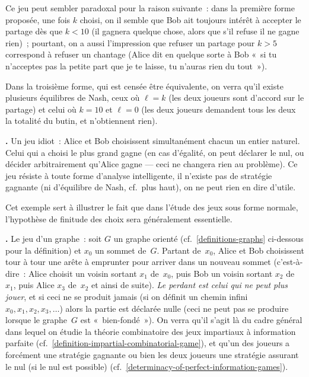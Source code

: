 \documentclass[12pt,a4paper]{article}
\theoremstyle{definition}
\newcommand\thingy{%
\refstepcounter{comcnt}\smallskip\noindent\textbf{\thecomcnt.} }
\begin{document}
Ce jeu peut sembler paradoxal pour la raison suivante : dans la
première forme proposée, une fois $k$ choisi, on il semble que Bob ait
toujours intérêt à accepter le partage dès que $k<10$ (il gagnera
quelque chose, alors que s'il refuse il ne gagne rien) ; pourtant, on
a aussi l'impression que refuser un partage pour $k>5$ correspond à
refuser un chantage (Alice dit en quelque sorte à Bob « si tu
n'acceptes pas la petite part que je te laisse, tu n'auras rien du
tout »).

Dans la troisième forme, qui est censée être équivalente, on verra
qu'il existe plusieurs équilibres de Nash, ceux où $\ell=k$ (les deux
joueurs sont d'accord sur le partage) et celui où $k=10$ et $\ell=0$
(les deux joueurs demandent tous les deux la totalité du butin, et
n'obtiennent rien).

\thingy Un jeu idiot : Alice et Bob choisissent simultanément chacun
un entier naturel.  Celui qui a choisi le plus grand gagne (en cas
d'égalité, on peut déclarer le nul, ou décider arbitrairement qu'Alice
gagne — ceci ne changera rien au problème).  Ce jeu résiste à toute
forme d'analyse intelligente, il n'existe pas de stratégie gagnante
(ni d'équilibre de Nash, cf. plus haut), on ne peut rien en dire
d'utile.

Cet exemple sert à illustrer le fait que dans l'étude des jeux sous
forme normale, l'hypothèse de finitude des choix sera généralement
essentielle.

\thingy\label{introduction-graph-game} Le jeu d'un graphe : soit $G$
un graphe orienté (cf. \ref{definitions-graphs} ci-dessous pour la
définition) et $x_0$ un sommet de $G$.  Partant de $x_0$, Alice et Bob
choisissent tour à tour une arête à emprunter pour arriver dans un
nouveau sommet (c'est-à-dire : Alice choisit un voisin sortant $x_1$
de $x_0$, puis Bob un voisin sortant $x_2$ de $x_1$, puis Alice $x_3$
de $x_2$ et ainsi de suite).  \emph{Le perdant est celui qui ne peut
  plus jouer}, et si ceci ne se produit jamais (si on définit un
chemin infini $x_0, x_1, x_2, x_3,\ldots$) alors la partie est
déclarée nulle (ceci ne peut pas se produire lorsque le graphe $G$ est
« bien-fondé »).  On verra qu'il s'agit là du cadre général dans
lequel on étudie la théorie combinatoire des jeux impartiaux à
information parfaite
(cf. \ref{definition-impartial-combinatorial-game}), et qu'un des
joueurs a forcément une stratégie gagnante ou bien les deux joueurs
une stratégie assurant le nul (si le nul est possible)
(cf. \ref{determinacy-of-perfect-information-games}).
\end{document}
